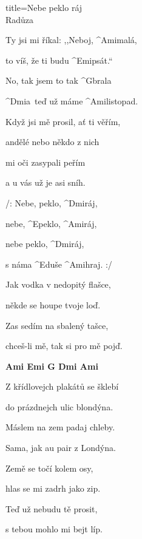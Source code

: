 \begin{song}{title=\predtitle\centering Nebe peklo ráj \\\large Radůza \vspace*{-0.3cm}}  %
\begin{centerjustified}
\nejnejvetsi

\begin{varwidth}[t]{0.48\textwidth}\setlength{\parindent}{\pindent}  %
\sloka 
	Ty jsi mi říkal: ,,Neboj, ^{Ami\z }malá,

	to víš, že ti budu ^{Emi\z}psát.``

	No, tak jsem to tak ^{G\z}brala

	^{Dmi\z}a~teď už máme ^{Ami\z}listopad.

\sloka
	Když jsi mě prosil, ať ti věřím,

	andělé nebo někdo z nich

	mi oči zasypali peřím

	a u vás už je asi sníh.

	/: Nebe, peklo, ^{Dmi\z}ráj,~~~

	nebe, ^{E\z}peklo, ^{Ami\z}ráj,~~~

	nebe peklo, ^{Dmi\z}ráj,~~~~

	s náma ^{E\z}duše ^{Ami}hraj. :/


\sloka
	Jak vodka v nedopitý flašce,

	někde se houpe tvoje loď.

	Zas sedím na sbalený tašce,

	chceš-li mě, tak si pro mě pojď.

    

\end{varwidth}\begin{varwidth}[t]{0.5\textwidth}\setlength{\parindent}{\pindent}
\vspace*{0.465cm}

\phantom{.}

\textbf{Ami  Emi  G  Dmi  Ami}


\sloka
	Z křídlovejch plakátů se šklebí
	
	do prázdnejch ulic blondýna.
	
	Máslem na zem padaj chleby.
	
	Sama, jak au pair z Londýna.

\sloka
	Země se točí kolem osy,
	
	hlas se mi zadrh jako zip.
	
	Teď už nebudu tě prosit,
	
	s tebou mohlo mi bejt líp.


\end{varwidth}

\end{centerjustified}
\setcounter{Slokočet}{0}
\end{song}
